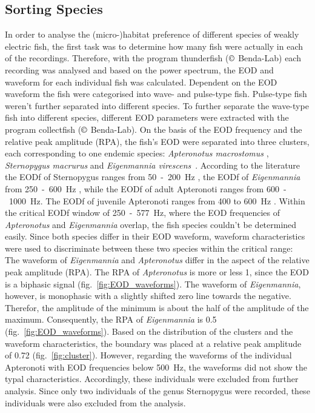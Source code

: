 \subsection{Sorting Species}
In order to analyse the (micro-)habitat preference of different species of weakly electric fish, the first task was to determine how many fish were actually in each of  the recordings. Therefore, with the program thunderfish ($\copyright$ Benda-Lab) each recording was analysed and based on the power spectrum, the EOD and waveform for each individual fish was calculated.
Dependent on the EOD waveform the fish were categorised into wave- and pulse-type fish. Pulse-type fish weren't further separated into different species. To further separate the wave-type fish into different species, different EOD parameters were extracted with the program collectfish ($\copyright$ Benda-Lab). On the basis of the EOD frequency and the relative peak amplitude (RPA), the fish's EOD were separated into three clusters, each corresponding to one endemic species: \textit{Apteronotus macrostomus} \citep{Santana2013}, \textit{Sternopygus macrurus} \citep{Keller1991} and \textit{Eigenmannia virescens}~\citep{silva2009cytogenetic}. According to the literature the EODf of Sternopygus ranges from 50~-~200~Hz \citep{Keller1991}, the EODf of \textit{Eigenmannia} from 250~-~600~Hz \citep{Hopkins_74}, while the EODf of adult Apteronoti ranges from 600~-~1000~Hz. The EODf of juvenile Apteronoti ranges from 400 to 600~Hz \citep{Meyer1987}.
Within the critical EODf window of 250~-~577~Hz, where the EOD frequencies of \textit{Apteronotus} and \textit{Eigenmannia} overlap, the fish species couldn't be determined easily. Since both species differ in their EOD waveform, waveform characteristics were used to discriminate between these two species within the critical range: The waveform of \textit{Eigenmannia} and \textit{Apteronotus} differ in the aspect of the relative peak amplitude (RPA). The RPA of \textit{Apteronotus} is more or less 1, since the EOD is a biphasic signal \citep{Zupanc_Bullock_2005} (fig.~\ref{fig:EOD_waveforms}). The waveform of \textit{Eigenmannia}, however, is monophasic \citep{Zupanc_Bullock_2005} with a slightly shifted zero line towards the negative. Therefor, the amplitude of the minimum is about the half of the amplitude of the maximum. Consequently, the RPA of \textit{Eigenmannia} is 0.5 (fig.~\ref{fig:EOD_waveforms}). Based on the distribution of the clusters and the waveform characteristics, the boundary was placed at a relative peak amplitude of 0.72 (fig.~\ref{fig:cluster}). However, regarding the waveforms of the individual Apteronoti with EOD frequencies below 500~Hz, the waveforms did not show the typal characteristics. Accordingly, these individuals were excluded from further analysis. Since only two individuals of the genus Sternopygus were recorded, these individuals were also excluded from the analysis.

